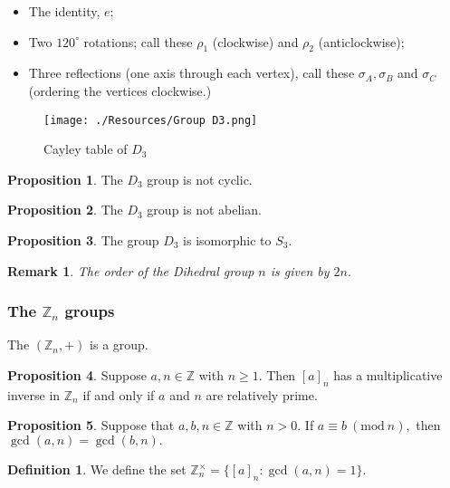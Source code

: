 \documentclass[12pt, a4paper]{article}
\newcommand{\bb}[1]{\mathbb{#1}}
\newcommand{\Mod}[1]{\ (\mathrm{mod}\ #1)}
\newtheorem*{remark}{Remark}
\theoremstyle{definition}
\newtheorem{definition}{Definition}[section]
\newtheorem{proposition}{Proposition}
\theoremstyle{plain}
\begin{document}
\begin{itemize}
	\item The identity, $e;$

	\item  Two $120^{\circ}$ rotations; call these $\rho_1$ (clockwise) and $\rho_2$ (anticlockwise);

	\item Three reflections (one axis through each vertex), call these $\sigma_A,\sigma_B$ and $\sigma_C$ (ordering the vertices clockwise.)
\end{itemize}

\begin{figure}[H]
\centering
\texttt{[image: ./Resources/Group D3.png]}
\caption{Cayley table of $D_3$}
\label{}
\end{figure}

\begin{proposition}
The $D_3$ group is not cyclic.
\end{proposition}

\begin{proposition}
The $D_3$ group is not abelian.
\end{proposition}

\begin{proposition}
The group $D_3$ is isomorphic to $S_3.$
\end{proposition}

\begin{remark}
The order of the Dihedral group $n$ is given by $2n.$
\end{remark}

\subsubsection{The \texorpdfstring{$\bb{Z}_n$}{TEXT} groups}

The $(\bb{Z}_n,+)$ is a group.

\begin{proposition}
Suppose $a, n \in \bb{Z}$ with $n \geq 1.$ Then $[a]_n$ has a multiplicative inverse in $\bb{Z}_n$ if and only if $a$ and $n$ are relatively prime.
\end{proposition}

\begin{proposition}
Suppose that $a,b,n \in \bb{Z}$ with $n > 0.$ If $a \equiv b \Mod{n},$ then $\gcd(a, n) = \gcd(b, n).$
\end{proposition}

\begin{definition}
We define the set $\bb{Z}_n^{\times}= \{[a]_n :\gcd(a,n)=1\}.$
\end{definition}
\end{document}
